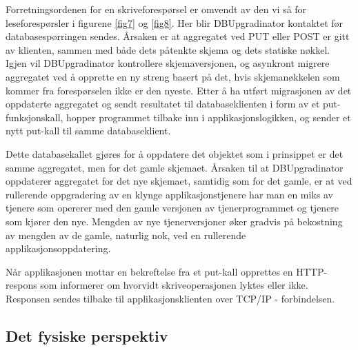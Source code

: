 Forretningsordenen for en skriveforespørsel er omvendt av den vi så for leseforespørsler i figurene \ref{fig7} og \ref{fig8}. Her blir DBUpgradinator kontaktet før databasespørringen sendes. Årsaken er at aggregatet ved PUT eller POST er gitt av klienten, sammen med både dets påtenkte skjema og dets statiske nøkkel. Igjen vil DBUpgradinator kontrollere skjemaversjonen, og asynkront migrere aggregatet ved å opprette en ny streng basert på det, hvis skjemanøkkelen som kommer fra forespørselen ikke er den nyeste. Etter å ha utført migrasjonen av det oppdaterte aggregatet og sendt resultatet til databaseklienten i form av et put-funksjonskall, hopper programmet tilbake inn i applikasjonslogikken, og sender et nytt put-kall til samme databaseklient.

Dette databasekallet gjøres for å oppdatere det objektet som i prinsippet er det samme aggregatet, men for det gamle skjemaet. Årsaken til at DBUpgradinator oppdaterer aggregatet for det nye skjemaet, samtidig som for det gamle, er at ved rullerende oppgradering av en klynge applikasjonstjenere har man en miks av tjenere som opererer med den gamle versjonen av tjenerprogrammet og tjenere som kjører den nye. Mengden av nye tjenerversjoner øker gradvis på bekostning av mengden av de gamle, naturlig nok, ved en rullerende applikasjonsoppdatering.

Når applikasjonen mottar en bekreftelse fra et put-kall opprettes en HTTP-respons som informerer om hvorvidt skriveoperasjonen lyktes eller ikke. Responsen sendes tilbake til applikasjonsklienten over TCP/IP - forbindelsen.

\subsection{Det fysiske perspektiv}


